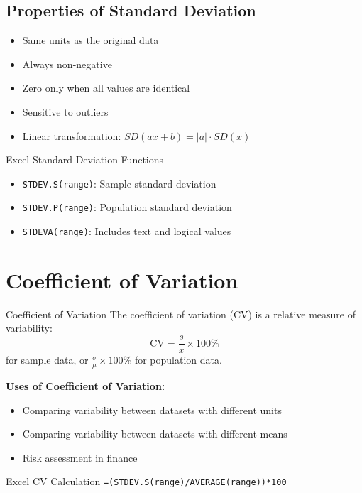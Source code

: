 \documentclass[12pt,a4paper]{book}
\begin{document}
\subsection{Properties of Standard Deviation}

\begin{itemize}
    \item Same units as the original data
    \item Always non-negative
    \item Zero only when all values are identical
    \item Sensitive to outliers
    \item Linear transformation: $SD(ax + b) = |a| \cdot SD(x)$
\end{itemize}

\begin{example}{Excel Standard Deviation Functions}
\begin{itemize}
    \item \texttt{STDEV.S(range)}: Sample standard deviation
    \item \texttt{STDEV.P(range)}: Population standard deviation
    \item \texttt{STDEVA(range)}: Includes text and logical values
\end{itemize}
\end{example}

\section{Coefficient of Variation}

\begin{definition}{Coefficient of Variation}
The coefficient of variation (CV) is a relative measure of variability:
\[
\text{CV} = \frac{s}{\bar{x}} \times 100\%
\]
for sample data, or $\frac{\sigma}{\mu} \times 100\%$ for population data.
\end{definition}

\textbf{Uses of Coefficient of Variation:}
\begin{itemize}
    \item Comparing variability between datasets with different units
    \item Comparing variability between datasets with different means
    \item Risk assessment in finance
\end{itemize}

\begin{example}{Excel CV Calculation}
\texttt{=(STDEV.S(range)/AVERAGE(range))*100}
\end{example}
\end{document}

